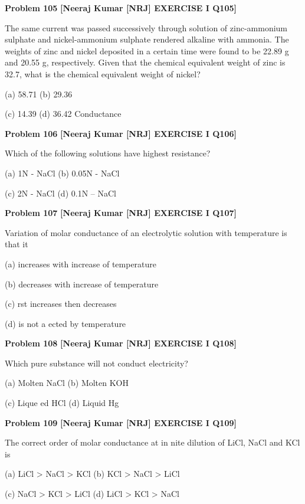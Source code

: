 \begin{problembox}
\textbf{Problem 105} \hfill \textbf{[Neeraj Kumar [NRJ] EXERCISE I Q105]}
\label{q:ext-nrj_all_questions-105}

The same current was passed successively through 
solution 
of 
zinc-ammonium 
sulphate 
and 
nickel-ammonium sulphate rendered alkaline 
with ammonia. The weights of zinc and nickel 
deposited in a certain time were found to be 
22.89 g and 20.55 g, respectively. Given that the 
chemical equivalent weight of zinc is 32.7, what is 
the chemical equivalent weight of nickel?
 
 (a) 58.71 
(b) 29.36
 
 (c) 14.39 
(d) 36.42
Conductance
\end{problembox}

\begin{problembox}
\textbf{Problem 106} \hfill \textbf{[Neeraj Kumar [NRJ] EXERCISE I Q106]}
\label{q:ext-nrj_all_questions-106}

Which of the following solutions have highest 
resistance?
 
 (a) 1N - NaCl 
(b) 0.05N - NaCl
 
 (c) 2N - NaCl 
(d) 0.1N -- NaCl
\end{problembox}

\begin{problembox}
\textbf{Problem 107} \hfill \textbf{[Neeraj Kumar [NRJ] EXERCISE I Q107]}
\label{q:ext-nrj_all_questions-107}

Variation of molar conductance of an electrolytic 
solution with temperature is that it
 
 (a)  increases with increase of  temperature
 
 (b)  decreases with increase of  temperature
 
 (c)   rst increases then decreases
 
 (d) is not a  ected by temperature
\end{problembox}

\begin{problembox}
\textbf{Problem 108} \hfill \textbf{[Neeraj Kumar [NRJ] EXERCISE I Q108]}
\label{q:ext-nrj_all_questions-108}

Which pure substance will not conduct electricity?
 
 (a) Molten NaCl 
(b) Molten KOH
 
 (c) Lique  ed HCl 
(d) Liquid Hg
\end{problembox}

\begin{problembox}
\textbf{Problem 109} \hfill \textbf{[Neeraj Kumar [NRJ] EXERCISE I Q109]}
\label{q:ext-nrj_all_questions-109}

The correct order of molar conductance at in  nite 
dilution of LiCl, NaCl and KCl is
 
 (a) LiCl > NaCl > KCl 
(b) KCl > NaCl > LiCl
 
 (c) NaCl > KCl > LiCl 
(d) LiCl > KCl > NaCl
\end{problembox}

